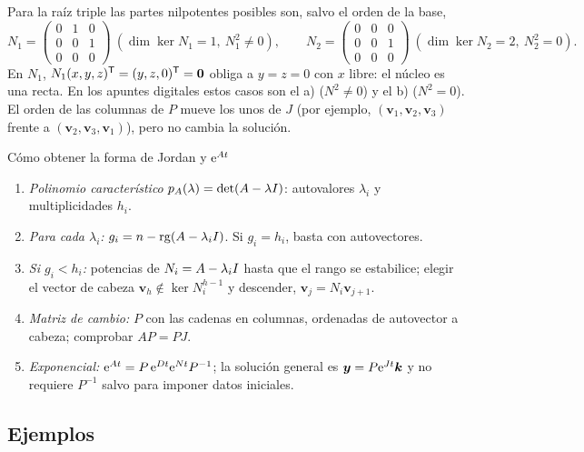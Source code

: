\documentclass[11pt,twoside]{article}
\newcommand\vy{\bm{y}}
\newcommand\vv{\bm{v}}
\newcommand\vk{\bm{k}}
\newcommand\mat[1]{\begin{pmatrix}#1\end{pmatrix}}
\begin{document}
\begin{observacion}
Para la raíz triple las partes nilpotentes posibles son, salvo el orden de la base,
\begin{equation*}
N_1=\mat{0&1&0\\0&0&1\\0&0&0}\ (\dim\ker N_1=1,\ N_1^2\neq0),\qquad
N_2=\mat{0&0&0\\0&0&1\\0&0&0}\ (\dim\ker N_2=2,\ N_2^2=0).
\end{equation*}
En $N_1$, $N_1(x,y,z)^{\mathsf T}=(y,z,0)^{\mathsf T}=\bm0$ obliga a $y=z=0$ con $x$ libre: el núcleo es una recta. En los apuntes
digitales estos casos son el a) ($N^2\neq0$) y el b) ($N^2=0$). El orden de las columnas de $P$ mueve los
unos de $J$ (por ejemplo, $(\vv_1,\vv_2,\vv_3)$ frente a $(\vv_2,\vv_3,\vv_1)$), pero no cambia la solución.
\end{observacion}

\begin{metodo}{Cómo obtener la forma de Jordan y $\mathrm{e}^{At}$}
\begin{enumerate}
\item \emph{Polinomio característico} $p_A(\lambda)=\det(A-\lambda I)$: autovalores $\lambda_i$ y multiplicidades $h_i$.
\item \emph{Para cada $\lambda_i$:} $g_i=n-\operatorname{rg}(A-\lambda_iI)$. Si $g_i=h_i$, basta con autovectores.
\item \emph{Si $g_i<h_i$:} potencias de $N_i=A-\lambda_iI$ hasta que el rango se estabilice; elegir el vector de
cabeza $\vv_h\notin\ker N_i^{h-1}$ y descender, $\vv_{j}=N_i\vv_{j+1}$.
\item \emph{Matriz de cambio:} $P$ con las cadenas en columnas, ordenadas de autovector a cabeza; comprobar $AP=PJ$.
\item \emph{Exponencial:} $\mathrm{e}^{At}=P\,\mathrm{e}^{Dt}\mathrm{e}^{Nt}P^{-1}$; la solución general es $\vy=P\e^{Jt}\vk$ y no requiere
$P^{-1}$ salvo para imponer datos iniciales.
\end{enumerate}
\end{metodo}

\subsection{Ejemplos}
\end{document}
